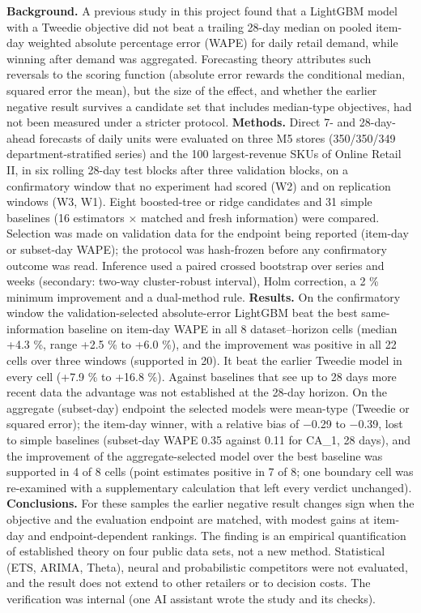 \documentclass[
]{article}
\begin{document}
\textbf{Background.} A previous study in this project found that a
LightGBM model with a Tweedie objective did not beat a trailing 28-day
median on pooled item-day weighted absolute percentage error (WAPE) for
daily retail demand, while winning after demand was aggregated.
Forecasting theory attributes such reversals to the scoring function
(absolute error rewards the conditional median, squared error the mean),
but the size of the effect, and whether the earlier negative result
survives a candidate set that includes median-type objectives, had not
been measured under a stricter protocol. \textbf{Methods.} Direct 7- and
28-day-ahead forecasts of daily units were evaluated on three M5 stores
(350/350/349 department-stratified series) and the 100 largest-revenue
SKUs of Online Retail II, in six rolling 28-day test blocks after three
validation blocks, on a confirmatory window that no experiment had
scored (W2) and on replication windows (W3, W1). Eight boosted-tree or
ridge candidates and 31 simple baselines (16 estimators × matched and
fresh information) were compared. Selection was made on validation data
for the endpoint being reported (item-day or subset-day WAPE); the
protocol was hash-frozen before any confirmatory outcome was read.
Inference used a paired crossed bootstrap over series and weeks
(secondary: two-way cluster-robust interval), Holm correction, a 2 \%
minimum improvement and a dual-method rule. \textbf{Results.} On the
confirmatory window the validation-selected absolute-error LightGBM beat
the best same-information baseline on item-day WAPE in all 8
dataset--horizon cells (median +4.3 \%, range +2.5 \% to +6.0 \%), and
the improvement was positive in all 22 cells over three windows
(supported in 20). It beat the earlier Tweedie model in every cell (+7.9
\% to +16.8 \%). Against baselines that see up to 28 days more recent
data the advantage was not established at the 28-day horizon. On the
aggregate (subset-day) endpoint the selected models were mean-type
(Tweedie or squared error); the item-day winner, with a relative bias of
−0.29 to −0.39, lost to simple baselines (subset-day WAPE 0.35 against
0.11 for CA\_1, 28 days), and the improvement of the aggregate-selected
model over the best baseline was supported in 4 of 8 cells (point
estimates positive in 7 of 8; one boundary cell was re-examined with a
supplementary calculation that left every verdict unchanged).
\textbf{Conclusions.} For these samples the earlier negative result
changes sign when the objective and the evaluation endpoint are matched,
with modest gains at item-day and endpoint-dependent rankings. The
finding is an empirical quantification of established theory on four
public data sets, not a new method. Statistical (ETS, ARIMA, Theta),
neural and probabilistic competitors were not evaluated, and the result
does not extend to other retailers or to decision costs. The
verification was internal (one AI assistant wrote the study and its
checks).
\end{document}
